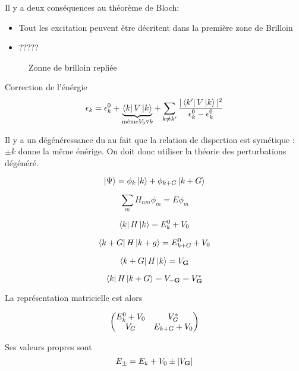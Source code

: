 Il y a deux conséquences au théorème de Bloch:
\begin{itemize}
	\item Tout les excitation peuvent être décritent dans la première zone de Brilloin
	\item ?????
\end{itemize}

\begin{figure}[ht]
    \centering
    \caption{Zonne de brilloin repliée}
    \label{fig:zonne-de-brilloin-repliée}
\end{figure}

Correction de l'énérgie 
$$\epsilon_{k} = \epsilon_{k}^0 + \underbrace{\bra{k}V\ket{k}}_{\text{même} V_{0} \forall k}+ \sum_{k\neq k'} \frac{|\bra{k'}V\ket{k}|^2}{\epsilon_{k}^0-\epsilon_{k}^0 }  $$ 

Il y a un dégénéressance du au fait que la relation de dispertion est symétique : $\pm k$ donne la même énérige. On doit donc utiliser la théorie des perturbations dégénéré.

$$\ket{\Psi} = \phi_{k} \ket{k} + \phi_{k+G} \ket{k+G}$$ 

$$\sum_{m} H_{nm} \phi_{m} = E \phi_m$$ 

$$\bra{k}H\ket{k} = E_{k}^0 + V_{0}$$ 

$$\bra{k+G}H \ket{k+g} = E_{k+G}^0 + V_0$$ 

$$\bra{k+G}H\ket{k} = V_{\vb{G}}$$ 

$$\bra{k}H\ket{k+G} = V_{-\vb{G}} = V_{\vb{G}}^*$$ 


La représentation matricielle est alors

$$\begin{pmatrix} E_{k}^0 +V_0 & V_{G}^* \\ V_{G} & E_{k+G} +V_0 \end{pmatrix}$$

Ses valeurs propres sont $$E_{\pm} = E_{k} + V_{0} \pm |V_{\vb{G}}| $$ 

	

